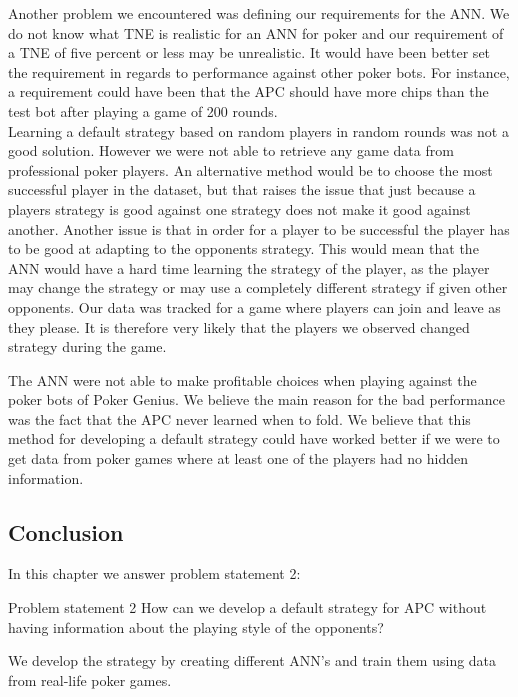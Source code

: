 Another problem we encountered was defining our requirements for the ANN. We do not know what TNE is realistic for an ANN for poker and our requirement of a TNE of five percent or less may be unrealistic. It would have been better set the requirement in regards to performance against other poker bots. For instance, a requirement could have been that the APC should have more chips than the test bot after playing a game of 200 rounds. \\

Learning a default strategy based on random players in random rounds was not a good solution. However we were not able to retrieve any game data from professional poker players.
An alternative method would be to choose the most successful player in the dataset, but that raises the issue that just because a players strategy is good against one strategy does not make it good against another.
Another issue is that in order for a player to be successful the player has to be good at adapting to the opponents strategy. This would mean that the ANN would have a hard time learning the strategy of the player, as the player may change the strategy or may use a completely different strategy if given other opponents. Our data was tracked for a game where players can join and leave as they please. It is therefore very likely that the players we observed changed strategy during the game. 

The ANN were not able to make profitable choices when playing against the poker bots of Poker Genius. We believe the main reason for the bad performance was the fact that the APC never learned when to fold. We believe that this method for developing a default strategy could have worked better if we were to get data from poker games where at least one of the players had no hidden information.

\subsection{Conclusion}
In this chapter we answer problem statement 2:

\vspace{4mm}
\begin{statementBox2}{Problem statement 2}
How can we develop a default strategy for APC without having information about the playing style of the opponents?
\end{statementBox2}
\vspace{4mm}

We develop the strategy by creating different ANN's and train them using data from real-life poker games.

